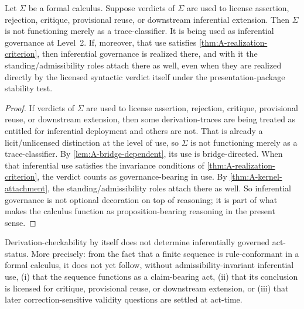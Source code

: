 \begin{theorem}
\label{thm:A-inferential-uptake}
Let $\Sigma$ be a formal calculus. Suppose verdicts of $\Sigma$ are used to license assertion, rejection, critique, provisional reuse, or downstream inferential extension. Then $\Sigma$ is not functioning merely as a trace-classifier. It is being used as inferential governance at Level~2. If, moreover, that use satisfies \cref{thm:A-realization-criterion}, then inferential governance is realized there, and with it the standing/admissibility roles attach there as well, even when they are realized directly by the licensed syntactic verdict itself under the presentation-package stability test.
\end{theorem}

\begin{proof}
If verdicts of $\Sigma$ are used to license assertion, rejection, critique, provisional reuse, or downstream extension, then some derivation-traces are being treated as entitled for inferential deployment and others are not. That is already a licit/unlicensed distinction at the level of use, so $\Sigma$ is not functioning merely as a trace-classifier. By \cref{lem:A-bridge-dependent}, its use is bridge-directed. When that inferential use satisfies the invariance conditions of \cref{thm:A-realization-criterion}, the verdict counts as governance-bearing in use. By \cref{thm:A-kernel-attachment}, the standing/admissibility roles attach there as well. So inferential governance is not optional decoration on top of reasoning; it is part of what makes the calculus function as proposition-bearing reasoning in the present sense.
\end{proof}

\begin{theorem}
\label{thm:A-trace-not-enough}
Derivation-checkability by itself does not determine inferentially governed act-status. More precisely: from the fact that a finite sequence is rule-conformant in a formal calculus, it does not yet follow, without admissibility-invariant inferential use, (i) that the sequence functions as a claim-bearing act, (ii) that its conclusion is licensed for critique, provisional reuse, or downstream extension, or (iii) that later correction-sensitive validity questions are settled at act-time.
\end{theorem}


